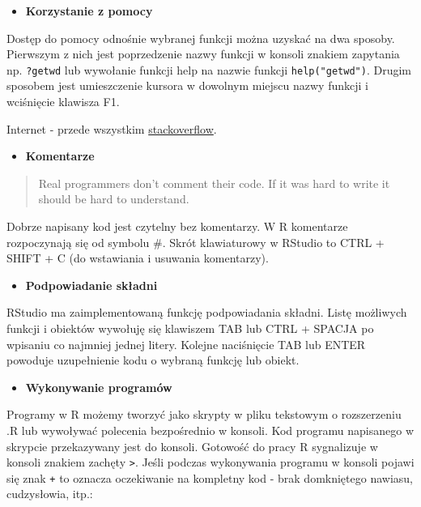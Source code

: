 \documentclass[
]{book}
\providecommand{\tightlist}{%
  \setlength{\itemsep}{0pt}\setlength{\parskip}{0pt}}
\begin{document}
\begin{itemize}
\tightlist
\item
  \textbf{Korzystanie z pomocy}
\end{itemize}

Dostęp do pomocy odnośnie wybranej funkcji można uzyskać na dwa sposoby. Pierwszym z nich jest poprzedzenie nazwy funkcji w konsoli znakiem zapytania np. \texttt{?getwd} lub wywołanie funkcji help na nazwie funkcji \texttt{help("getwd")}. Drugim sposobem jest umieszczenie kursora w dowolnym miejscu nazwy funkcji i wciśnięcie klawisza F1.

Internet - przede wszystkim \href{https://stackoverflow.com/questions/tagged/r}{stackoverflow}.

\begin{itemize}
\tightlist
\item
  \textbf{Komentarze}
\end{itemize}

\begin{quote}
Real programmers don't comment their code. If it was hard to write it should be hard to understand.
\end{quote}

Dobrze napisany kod jest czytelny bez komentarzy. W R komentarze rozpoczynają się od symbolu \#. Skrót klawiaturowy w RStudio to CTRL + SHIFT + C (do wstawiania i usuwania komentarzy).

\begin{itemize}
\tightlist
\item
  \textbf{Podpowiadanie składni}
\end{itemize}

RStudio ma zaimplementowaną funkcję podpowiadania składni. Listę możliwych funkcji i obiektów wywołuję się klawiszem TAB lub CTRL + SPACJA po wpisaniu co najmniej jednej litery. Kolejne naciśnięcie TAB lub ENTER powoduje uzupełnienie kodu o wybraną funkcję lub obiekt.

\begin{itemize}
\tightlist
\item
  \textbf{Wykonywanie programów}
\end{itemize}

Programy w R możemy tworzyć jako skrypty w pliku tekstowym o rozszerzeniu .R lub wywoływać polecenia bezpośrednio w konsoli. Kod programu napisanego w skrypcie przekazywany jest do konsoli. Gotowość do pracy R sygnalizuje w konsoli znakiem zachęty \texttt{\textgreater{}}. Jeśli podczas wykonywania programu w konsoli pojawi się znak \texttt{+} to oznacza oczekiwanie na kompletny kod - brak domkniętego nawiasu, cudzysłowia, itp.:
\end{document}
